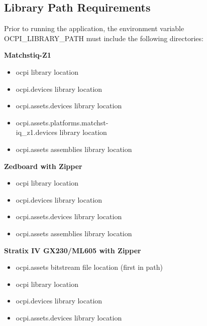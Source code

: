 \documentclass{article}
\begin{document}
\subsection{Library Path Requirements}
\noindent Prior to running the application, the environment variable OCPI\_LIBRARY\_PATH must include the following directories:\par\medskip
\begin{minipage}[t]{.3\textwidth}
	\textbf{Matchstiq-Z1}
	\begin{itemize}
		\item ocpi library location
		\item ocpi.devices library location
		\item ocpi.assets.devices library location
		\item ocpi.assets.platforms.matchst-\\iq\_z1.devices library location
		\item ocpi.assets assemblies library location
	\end{itemize}
	\end{minipage}
\begin{minipage}[t]{.3\textwidth}
	\textbf{Zedboard with Zipper}
	\begin{itemize}
		\item ocpi library location
		\item ocpi.devices library location
		\item ocpi.assets.devices library location
		\item ocpi.assets assemblies library location
	\end{itemize}
	\end{minipage}
\begin{minipage}[t]{.3\textwidth}
	\textbf{Stratix IV GX230/ML605 with Zipper}
	\begin{itemize}
		\item ocpi.assets bitstream file location (first in path)
		\item ocpi library location
		\item ocpi.devices library location
		\item ocpi.assets.devices library location
	\end{itemize}
	\end{minipage}
	\par\bigskip\bigskip
\end{document}
